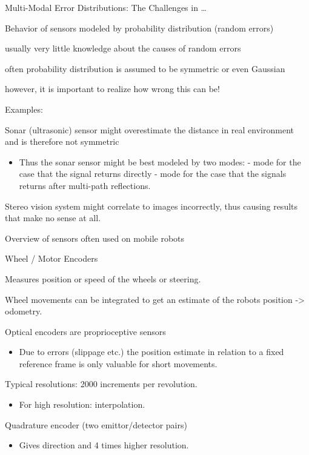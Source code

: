 \documentclass[compress]{beamer}
\providecommand{\tightlist}{%
  \setlength{\itemsep}{0pt}\setlength{\parskip}{0pt}}
\begin{document}
\begin{frame}{Multi-Modal Error Distributions: The Challenges in
\ldots{}}

Behavior of sensors modeled by probability distribution (random errors)

usually very little knowledge about the causes of random errors

often probability distribution is assumed to be symmetric or even
Gaussian

however, it is important to realize how wrong this can be!

Examples:

Sonar (ultrasonic) sensor might overestimate the distance in real
environment and is therefore not symmetric

\begin{itemize}
\tightlist
\item
  Thus the sonar sensor might be best modeled by two modes: - mode for
  the case that the signal returns directly - mode for the case that the
  signals returns after multi-path reflections.
\end{itemize}

Stereo vision system might correlate to images incorrectly, thus causing
results that make no sense at all.

\end{frame}

\begin{frame}{Overview of sensors often used on mobile robots}

\end{frame}

\begin{frame}{Wheel / Motor Encoders}

Measures position or speed of the wheels or steering.

Wheel movements can be integrated to get an estimate of the robots
position -\textgreater{} odometry.

Optical encoders are proprioceptive sensors

\begin{itemize}
\tightlist
\item
  Due to errors (slippage etc.) the position estimate in relation to a
  fixed reference frame is only valuable for short movements.
\end{itemize}

Typical resolutions: 2000 increments per revolution.

\begin{itemize}
\tightlist
\item
  For high resolution: interpolation.
\end{itemize}

Quadrature encoder (two emittor/detector pairs)

\begin{itemize}
\tightlist
\item
  Gives direction and 4 times higher resolution.
\end{itemize}

\end{frame}
\end{document}
